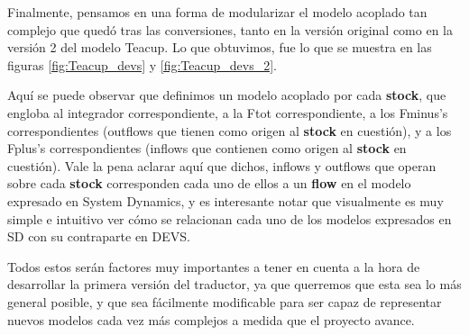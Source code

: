 Finalmente, pensamos en una forma de modularizar el modelo acoplado tan complejo que quedó tras las conversiones, tanto en la versión original como en la versión 2 del modelo Teacup. Lo que obtuvimos, fue lo que se muestra en las figuras \ref{fig:Teacup_devs} y \ref{fig:Teacup_devs_2}.

Aquí se puede observar que definimos un modelo acoplado por cada \textbf{stock}, que engloba al integrador correspondiente, a la Ftot correspondiente, a los Fminus's correspondientes (outflows que tienen como origen al \textbf{stock} en cuestión), y a los Fplus's correspondientes (inflows que contienen como origen al \textbf{stock} en cuestión). Vale la pena aclarar aquí que dichos, inflows y outflows que operan sobre cada \textbf{stock} corresponden cada uno de ellos a un \textbf{flow} en el modelo expresado en System Dynamics, y es interesante notar que visualmente es muy simple e intuitivo ver cómo se relacionan cada uno de los modelos expresados en SD con su contraparte en DEVS. 

Todos estos serán factores muy importantes a tener en cuenta a la hora de desarrollar la primera versión del traductor, ya que querremos que esta sea lo más general posible, y que sea fácilmente modificable para ser capaz de representar nuevos modelos cada vez más complejos a medida que el proyecto avance.


